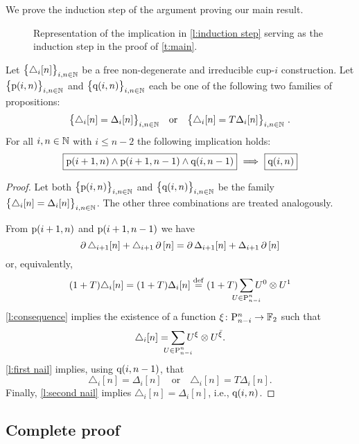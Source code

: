 We prove the induction step of the argument proving our main result.

\begin{figure}
	\centering
	
	\caption{Representation of the implication in \cref{l:induction step} serving as the induction step in the proof of \cref{t:main}.}
	\label{f:induction step}
\end{figure}

\begin{lemma}\label{l:induction step}
	Let $\big\{ \triangle_i [n] \big\}_{i,n\in\mathbb{N}}$ be a free non-degenerate and irreducible \mbox{cup-$i$} construction.
	Let $\big\{ \mathrm{p}(i,n) \big\}_{i,n \in \mathbb{N}}$ and $\big\{ \mathrm{q}(i,n) \big\}_{i,n \in \mathbb{N}}$ each be one of the following two families of propositions:
	\[
	\big\{ \triangle_i [n] = \Delta_ i [n] \big\}_{i,n \in \N}
	\quad \text{or} \quad
	\big\{ \triangle_i [n] = T \Delta_ i [n] \big\}_{i,n \in \N} \ .
	\]
	For all $i,n \in \mathbb{N}$ with $i \leq n-2$ the following implication holds:
	\[
	\boxed{\mathrm{p}(i+1,n) \wedge \mathrm{p}(i+1,n-1) \wedge \mathrm{q}(i,n-1)}\ \Longrightarrow\ \boxed{\mathrm{q}(i,n)}
	\]
\end{lemma}

\begin{proof}
	Let both $\big\{ \mathrm{p}(i,n) \big\}_{i,n\in\mathbb{N}}$ and $\big\{ \mathrm{q}(i,n) \big\}_{i,n\in\mathbb{N}}$ be the family $\big\{ \triangle_i [n] = \Delta_i [n] \big\}_{i,n \in \mathbb{N}}$.
	The other three combinations are treated analogously.

	From $\mathrm{p}(i+1,n)$ and $\mathrm{p}(i+1,n-1)$ we have
	\[
	\operatorname{\partial} \triangle_{i+1} [n] + \triangle_{i+1} \operatorname{\partial} \, [n] =
	\operatorname{\partial} \Delta_{i+1} [n] + \Delta_{i+1} \operatorname{\partial} \, [n]
	\]
	or, equivalently,
	\begin{align*}
	(1+T) \triangle_i [n] =
	(1+T) \Delta_i [n] \defeq
	(1+T) \sum_{\mathclap{U \in \P_{n-i}^n}} {U^0} \ot {U^1}
	\end{align*}
	\cref{l:consequence} implies the existence of a function $\xi \colon \mathrm{P}_{n-i}^n \to {\mathbb{F}_2}$ such that
	\[
	\triangle_i [n] =
	\sum_{\mathclap{U \in \P_{n-i}^n}} U^\xi \ot U^\barxi.
	\]
	\cref{l:first nail} implies, using $\mathrm{q}(i,n-1)$, that
	\[
	\triangle_i [n] = \Delta_i [n]
	\quad \text{or} \quad
	\triangle_i [n] = T \Delta_i [n].
	\]
	Finally, \cref{l:second nail} implies $\triangle_i [n] = \Delta_i [n]$, i.e., $\mathrm{q}(i,n)$.
\end{proof}

\subsection{Complete proof}\label{ss:proof}

